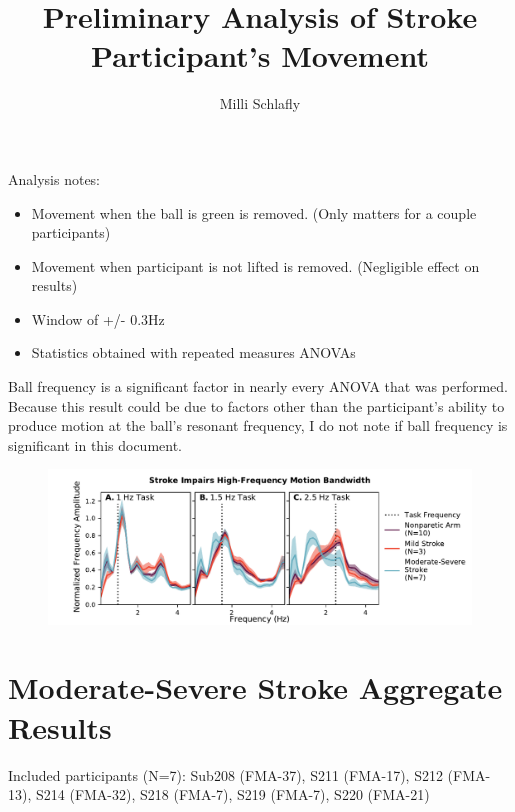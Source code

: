 \documentclass{article}
\title{Preliminary Analysis of Stroke Participant's Movement}
\author{Milli Schlafly}
\begin{document}
\maketitle

Analysis notes:
\begin{itemize}
	\item Movement when the ball is green is removed. (Only matters for a couple participants)
	\item Movement when participant is not lifted is removed. (Negligible effect on results)
	\item Window of +/- 0.3Hz
	\item Statistics obtained with repeated measures ANOVAs
\end{itemize}

Ball frequency is a significant factor in nearly every ANOVA that was performed. Because this result could be due to factors other than the participant's ability to produce motion at the ball's resonant frequency, I do not note if ball frequency is significant in this document. 



\begin{figure}[!ht]
     \centering
     \includegraphics[width=\linewidth]{Plots/plots_combined.pdf}
\end{figure}


\section{Moderate-Severe Stroke Aggregate Results}

Included participants (N=7): Sub208 (FMA-37), S211 (FMA-17), S212 (FMA-13), S214 (FMA-32), S218 (FMA-7), S219 (FMA-7), S220 (FMA-21) 
\end{document}
